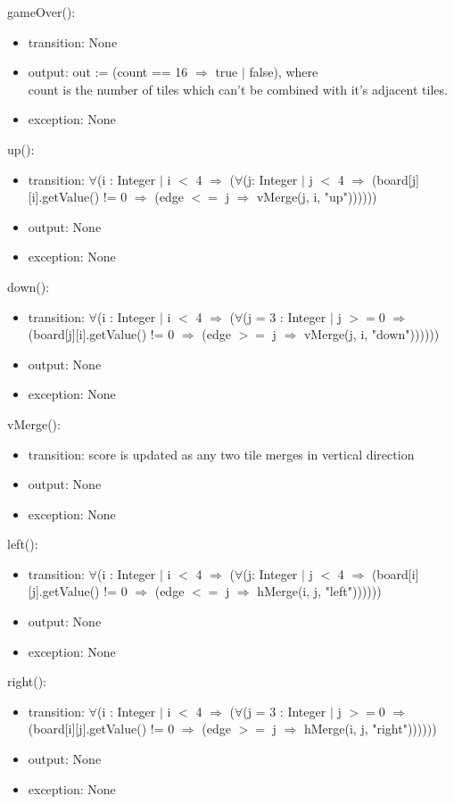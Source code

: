 \documentclass[12pt]{article}
\begin{document}
\noindent gameOver():
\begin{itemize}
  \item transition: None
  \item output: out := (count == 16 $\Rightarrow$ true $|$ false), where\\
  count is the number of tiles which can't be combined with it's adjacent tiles.
  \item exception: None
\end{itemize}

\noindent up():
\begin{itemize}
  \item transition: $\forall$(i : Integer $|$ i $<$ 4 $\Rightarrow$ ($\forall$(j: Integer $|$ j $<$ 4 $\Rightarrow$ (board[j][i].getValue() != 0 $\Rightarrow$ (edge $<=$ j $\Rightarrow$ vMerge(j, i, "up"))))))
  \item output: None
  \item exception: None
\end{itemize}

\noindent down():
\begin{itemize}
  \item transition: $\forall$(i : Integer $|$ i $<$ 4 $\Rightarrow$ ($\forall$(j = 3 : Integer $|$ j $>= 0$ $\Rightarrow$ (board[j][i].getValue() != 0 $\Rightarrow$ (edge $>=$ j $\Rightarrow$ vMerge(j, i, "down"))))))
  \item output: None
  \item exception: None
\end{itemize}

\noindent vMerge():
\begin{itemize}
  \item transition: score is updated as any two tile merges in vertical direction
  \item output: None
  \item exception: None
\end{itemize}

\noindent left():
\begin{itemize}
  \item transition: $\forall$(i : Integer $|$ i $<$ 4 $\Rightarrow$ ($\forall$(j: Integer $|$ j $<$ 4 $\Rightarrow$ (board[i][j].getValue() != 0 $\Rightarrow$ (edge $<=$ j $\Rightarrow$ hMerge(i, j, "left"))))))
  \item output: None
  \item exception: None
\end{itemize}

\noindent right():
\begin{itemize}
  \item transition: $\forall$(i : Integer $|$ i $<$ 4 $\Rightarrow$ ($\forall$(j = 3 : Integer $|$ j $>= 0$ $\Rightarrow$ (board[i][j].getValue() != 0 $\Rightarrow$ (edge $>=$ j $\Rightarrow$ hMerge(i, j, "right"))))))
  \item output: None
  \item exception: None
\end{itemize}
\end{document}

